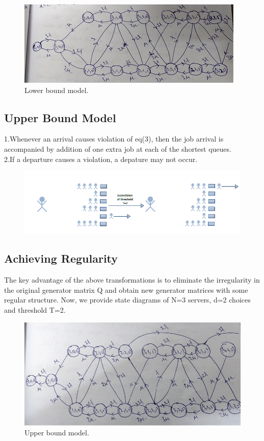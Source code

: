 \documentclass[a4paper,english,12pt]{article}
\begin{document}
\begin{figure}[h]
\centering
\includegraphics[scale=1]{Figures/lbm}
\caption{Lower bound model.}
\label{fig:Lower bound model.}

\end{figure}
\subsection{Upper Bound Model}
1.Whenever an arrival causes violation of eq(3), then the job arrival is accompanied by addition of one extra job at each of the shortest queues.
\\2.If a departure causes a violation, a depature may not occur.
\begin{figure}[h]
\centering
\includegraphics[scale=1]{Figures/ub}
\end{figure}
\subsection{Achieving Regularity}
The key advantage of the above transformations is to eliminate the irregularity in the original generator matrix Q and obtain new generator matrices with some regular structure. Now, we provide state diagrams of N=3 servers, d=2 choices and threshold T=2.
\begin{figure}[h]
\centering
\includegraphics[scale=0.7]{Figures/ubm}
\caption{Upper bound model.}
\label{fig:Upper bound model.}
\end{figure}
\end{document}

